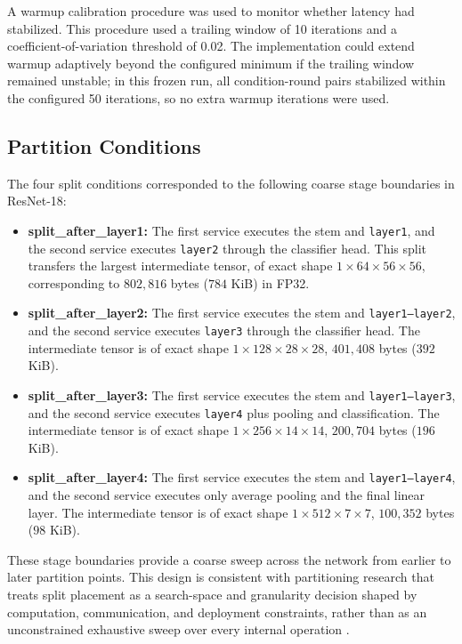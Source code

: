A warmup calibration procedure was used to monitor whether latency had stabilized. This procedure used a trailing window of 10 iterations and a coefficient-of-variation threshold of 0.02. The implementation could extend warmup adaptively beyond the configured minimum if the trailing window remained unstable; in this frozen run, all condition-round pairs stabilized within the configured 50 iterations, so no extra warmup iterations were used.

\subsection{Partition Conditions}
The four split conditions corresponded to the following coarse stage boundaries in ResNet-18:

\begin{itemize}
    \item \textbf{split\_after\_layer1:} The first service executes the stem and \texttt{layer1}, and the second service executes \texttt{layer2} through the classifier head. This split transfers the largest intermediate tensor, of exact shape $1 \times 64 \times 56 \times 56$, corresponding to $802{,}816$ bytes ($784$ KiB) in FP32.
    \item \textbf{split\_after\_layer2:} The first service executes the stem and \texttt{layer1--layer2}, and the second service executes \texttt{layer3} through the classifier head. The intermediate tensor is of exact shape $1 \times 128 \times 28 \times 28$, $401{,}408$ bytes ($392$ KiB).
    \item \textbf{split\_after\_layer3:} The first service executes the stem and \texttt{layer1--layer3}, and the second service executes \texttt{layer4} plus pooling and classification. The intermediate tensor is of exact shape $1 \times 256 \times 14 \times 14$, $200{,}704$ bytes ($196$ KiB).
    \item \textbf{split\_after\_layer4:} The first service executes the stem and \texttt{layer1--layer4}, and the second service executes only average pooling and the final linear layer. The intermediate tensor is of exact shape $1 \times 512 \times 7 \times 7$, $100{,}352$ bytes ($98$ KiB).
\end{itemize}

These stage boundaries provide a coarse sweep across the network from earlier to later partition points. This design is consistent with partitioning research that treats split placement as a search-space and granularity decision shaped by computation, communication, and deployment constraints, rather than as an unconstrained exhaustive sweep over every internal operation \cite{dnnsplit, pareto_split, survey_partitioning}.

